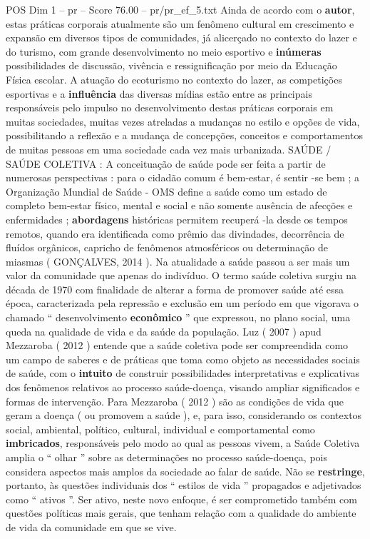 \begin{textsample}{POS Dim 1 – pr – Score 76.00 – pr/pr\_ef\_5.txt}
Ainda de acordo com o \textbf{autor}, estas práticas corporais atualmente são um fenômeno cultural em crescimento e expansão em diversos tipos de comunidades, já alicerçado no contexto do lazer e do turismo, com grande desenvolvimento no meio esportivo e \textbf{inúmeras} possibilidades de discussão, vivência e ressignificação por meio da Educação Física escolar.
A atuação do ecoturismo no contexto do lazer, as competições esportivas e a \textbf{influência} das diversas mídias estão entre as principais responsáveis pelo impulso no desenvolvimento destas práticas corporais em muitas sociedades, muitas vezes atreladas a mudanças no estilo e opções de vida, possibilitando a reflexão e a mudança de concepções, conceitos e comportamentos de muitas pessoas em uma sociedade cada vez mais urbanizada.
SAÚDE / SAÚDE COLETIVA : A conceituação de saúde pode ser feita a partir de numerosas perspectivas : para o cidadão comum é bem-estar, é sentir -se bem ; a Organização Mundial de Saúde - OMS define a saúde como um estado de completo bem-estar físico, mental e social e não somente ausência de afecções e enfermidades ; \textbf{abordagens} históricas permitem recuperá -la desde os tempos remotos, quando era identificada como prêmio das divindades, decorrência de fluídos orgânicos, capricho de fenômenos atmosféricos ou determinação de miasmas ( GONÇALVES, 2014 ).
Na atualidade a saúde passou a ser mais um valor da comunidade que apenas do indivíduo.
O termo saúde coletiva surgiu na década de 1970 com finalidade de alterar a forma de promover saúde até essa época, caracterizada pela repressão e exclusão em um período em que vigorava o chamado “ desenvolvimento \textbf{econômico} ” que expressou, no plano social, uma queda na qualidade de vida e da saúde da população.
Luz ( 2007 ) apud Mezzaroba ( 2012 ) entende que a saúde coletiva pode ser compreendida como um campo de saberes e de práticas que toma como objeto as necessidades sociais de saúde, com o \textbf{intuito} de construir possibilidades interpretativas e explicativas dos fenômenos relativos ao processo saúde-doença, visando ampliar significados e formas de intervenção.
Para Mezzaroba ( 2012 ) são as condições de vida que geram a doença ( ou promovem a saúde ), e, para isso, considerando os contextos social, ambiental, político, cultural, individual e comportamental como \textbf{imbricados}, responsáveis pelo modo ao qual as pessoas vivem, a Saúde Coletiva amplia o “ olhar ” sobre as determinações no processo saúde-doença, pois considera aspectos mais amplos da sociedade ao falar de saúde.
Não se \textbf{restringe}, portanto, às questões individuais dos “ estilos de vida ” propagados e adjetivados como “ ativos ”.
Ser ativo, neste novo enfoque, é ser comprometido também com questões políticas mais gerais, que tenham relação com a qualidade do ambiente de vida da comunidade em que se vive.


\end{textsample}
